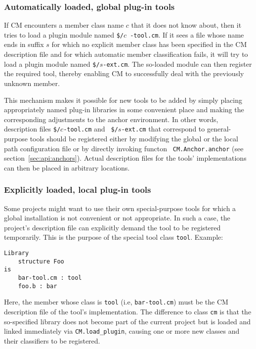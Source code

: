 \subsubsection{Automatically loaded, global plug-in tools}

If CM encounters a member class name $c$ that it does not know about,
then it tries to load a plugin module named {\tt \$/}$c${\tt
-tool.cm}.  If it sees a file whose name ends in suffix $s$ for which
no explicit member class has been specified in the CM description file
and for which automatic member classification fails, it will try to
load a plugin module named {\tt \$/}$s${\tt -ext.cm}.  The so-loaded
module can then register the required tool, thereby enabling CM to
successfully deal with the previously unknown member.

This mechanism makes it possible for new tools to be added by simply
placing appropriately named plug-in libraries in some convenient place
and making the corresponding adjustments to the anchor environment.
In other words, description files {\tt \$/}$c${\tt -tool.cm} and {\tt
\$/}$s${\tt -ext.cm} that correspond to general-purpose tools should
be registered either by modifying the global or the local path
configuration file or by directly invoking functon {\tt
CM.Anchor.anchor} (see section~\ref{sec:api:anchors}).  Actual
description files for the tools' implementations can then be placed in
arbitrary locations.

\subsubsection{Explicitly loaded, local plug-in tools}
\label{sec:localtools}

Some projects might want to use their own special-purpose tools for
which a global installation is not convenient or not appropriate.  In
such a case, the project's description file can explicitly demand the
tool to be registered temporarily.  This is the purpose of the special
tool class {\tt tool}.  Example:

\begin{verbatim}
Library
    structure Foo
is
    bar-tool.cm : tool
    foo.b : bar
\end{verbatim}

Here, the member whose class is {\tt tool} (i.e, {\tt bar-tool.cm})
must be the CM description file of the tool's implementation.  The
difference to class {\tt cm} is that the so-specified library does not
become part of the current project but is loaded and linked
immediately via {\tt CM.load\_plugin}, causing one or more new classes
and their classifiers to be registered.

